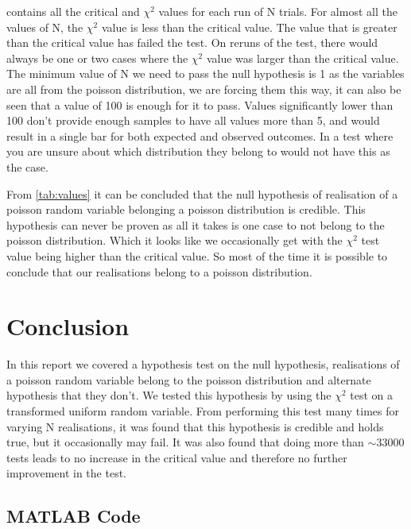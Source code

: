 \documentclass[a4paper, 12pt]{article}
\begin{document}
            \par
             contains all the critical and $\chi^2$ values for each run of N trials. For almost all the values of N, the $\chi^2$ value is less than the critical value. The value that is greater than the critical value has failed the test. On reruns of the test, there would always be one or two cases where the $\chi^2$ value was larger than the critical value. The minimum value of N we need to pass the null hypothesis is 1 as the variables are all from the poisson distribution, we are forcing them this way, it can also be seen that a value of 100 is enough for it to pass. Values significantly lower than 100 don't provide enough samples to have all values more than 5, and would result in a single bar for both expected and observed outcomes. In a test where you are unsure about which distribution they belong to would not have this as the case.
            \par
            From \cref{tab:values} it can be concluded that the null hypothesis of realisation of a poisson random variable belonging a poisson distribution is credible. This hypothesis can never be proven as all it takes is one case to not belong to the poisson distribution. Which it looks like we occasionally get with the $\chi^2$ test value being higher than the critical value. So most of the time it is possible to conclude that our realisations belong to a poisson distribution.
        
    \section{Conclusion}
        In this report we covered a hypothesis test on the null hypothesis, realisations of a poisson random variable belong to the poisson distribution and alternate hypothesis that they don't. We tested this hypothesis by using the $\chi^2$ test on a transformed uniform random variable. From performing this test many times for varying N realisations, it was found that this hypothesis is credible and holds true, but it occasionally may fail. It was also found that doing more than $\sim 33000$ tests leads to no increase in the critical value and therefore no further improvement in the test.


    \begin{appendices}
        \section{MATLAB Code}
            
    \end{appendices}
\end{document}
